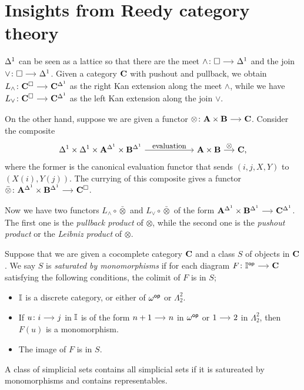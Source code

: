 \documentclass[a4paper,  dvipsnames, 11pt]{amsart}
\begin{document}
\section{Insights from Reedy category theory}
\begin{observation}
	\label{obs:Leibniz}
	${\Delta^1}$ can be seen as a lattice so that there are
	the meet $\land\colon\Box\arr\ra$ and the join $\lor\colon\Box\arr\ra$.
	Given a category $\mathbf{C}$ with pushout and pullback,
	we obtain $L_\land\colon\one{C}^\Box\arr\one{C}^\ra$ as the right Kan extension along the meet $\land$,
	while we have $L_\lor\colon\one{C}^\Box\arr\one{C}^\ra$ as the left Kan extension along the join $\lor$.

	On the other hand, suppose we are given a functor $\otimes\colon\one{A}\times\one{B}\arr\one{C}$.
	Consider the composite
	\[
		\ra\times\ra\times\one{A}^\ra\times\one{B}^\ra
		\arr"\text{evaluation}"[][6]
		\one{A}\times\one{B}
		\arr"\otimes"
		\one{C}\text{,}
	\]
	where the former is the canonical evaluation functor that sends $(i,j,X,Y)$ to $(X(i),Y(j))$.
	The currying of this composite gives a functor $\bar\otimes\colon\one{A}^\ra\times\one{B}^\ra\arr\one{C}^\Box$.

	Now we have two functors $L_\land\circ\bar\otimes$ and $L_\lor\circ\bar\otimes$ of the form $\one{A}^\ra\times\one{B}^\ra\arr\one{C}^\ra$.
	The first one is the \textit{pullback product} of $\otimes$, while the second one is the \textit{pushout product} or the \textit{Leibniz product} of $\otimes$.
\end{observation}
\begin{definition}
	\label{defn:SatMono}
	Suppose that we are given a cocomplete category $\mathbf{C}$ and a class $S$ of objects in $\mathbf{C}$.
	We say $S$ is \emph{saturated by monomorphisms}
	if for each diagram $F\colon\dI^\op\arr\one{C}$ satisfying the following conditions,
	the colimit of $F$ is in $S$;
	\begin{itemize}
		\item %
			$\mathbb{I}$ is a discrete category, or either of
			$\omega^{\mathsf{op}}$ or $\Lambda^2_2$.
		\item %
			If $u\colon i\arr j$ in $\mathbb{I}$ is of the form $n+1\arr n$ in $\omega^{\mathsf{op}}$ or $1\arr 2$ in $\Lambda^2_2$,
			then $F(u)$ is a monomorphism.
		\item %
			The image of $F$ is in $S$.
		\qedhere %
	\end{itemize}
\end{definition}
\begin{fact}
	\label{fact:SatMono}
	A class of simplicial sets contains all simplicial sets
	if it is satureated by monomorphisms and contains representables.
\end{fact}
\end{document}
